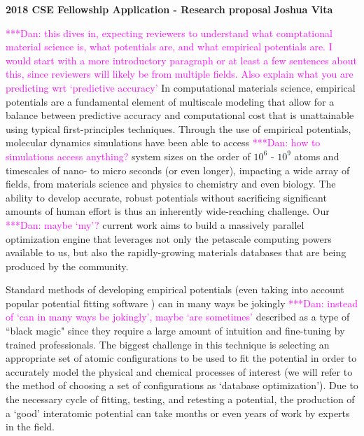 \documentclass{article}
\newcommand{\katznote}[1]{ {\textcolor{magenta}    { ***Dan:      #1 }}}
\begin{document}
\begin{center}
    \textbf{2018 CSE Fellowship Application - Research proposal}
\hfill
\textbf{Joshua Vita}
\end{center}
\noindent\hrulefill

\bigskip

\katznote{this dives in, expecting reviewers to understand what comptational material science is, what potentials are, and what empirical potentials are.  I would start with a more introductory paragraph or at least a few sentences about this, since reviewers will likely be from multiple fields.  Also explain what you are predicting wrt `predictive accuracy'} In computational materials science, empirical potentials are a fundamental element of multiscale modeling that allow for a balance between predictive accuracy and computational cost that is unattainable using typical first-principles techniques. Through the use of empirical potentials, molecular dynamics simulations have been able to access \katznote{how to simulations access anything?} system sizes on the order of $10^6$ - $10^9$ atoms and timescales of nano- to micro seconds (or even longer), impacting a wide array of fields, from materials science and physics to chemistry and even biology. The ability to develop accurate, robust potentials without sacrificing significant amounts of human effort is thus an inherently wide-reaching challenge. Our \katznote{maybe `my'?} current work aims to build a massively parallel optimization engine that leverages not only the petascale computing powers available to us, but also the rapidly-growing materials databases that are being produced by the community.

\bigskip

Standard methods of developing empirical potentials (even taking into account popular potential fitting software \cite{potfit}) can in many ways be jokingly \katznote{instead of `can in many ways be jokingly', maybe `are sometimes'} described as a type of ``black magic" since they require a large amount of intuition and fine-tuning by trained professionals. The biggest challenge in this technique is selecting an appropriate set of atomic configurations to be used to fit the potential in order to accurately model the physical and chemical processes of interest (we will refer to the method of choosing a set of configurations as `database optimization'). Due to the necessary cycle of fitting, testing, and retesting a potential, the production of a `good' interatomic potential can take months or even years of work by experts in the field.
\end{document}
